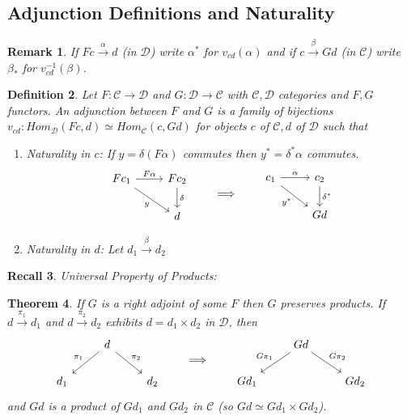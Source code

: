 \documentclass[a4paper,12pt]{article}
\newtheorem{thm}{Theorem}[section]
\newtheorem{defn}[thm]{Definition}
\newtheorem{rmk}[thm]{Remark}
\newtheorem{rec}[thm]{Recall}
\begin{document}
\subsection{Adjunction Definitions and Naturality}
\begin{rmk}
    If $Fc\xrightarrow{\alpha} d$ (in $\mathcal{D}$) write $\alpha^*$ for $v_{cd}(\alpha)$ and if $c\xrightarrow{\beta}Gd$ (in $\mathcal{C}$) write $\beta_*$ for $v_{cd}^{-1}(\beta)$. 
\end{rmk}
\begin{defn}
    Let $F:\mathcal{C}\to\mathcal{D}$ and $G:\mathcal{D}\to \mathcal{C}$ with $\mathcal{C,D}$ categories and $F,G$ functors. An adjunction between $F$ and $G$ is a family of bijections $v_{cd}:Hom_{\mathcal{D}}(Fc,d)\simeq Hom_{\mathcal{C}}(c,Gd)$ for objects $c$ of $\mathcal{C}, d$ of $\mathcal{D}$ such that 
    \begin{enumerate}
        \item Naturality in $c$: If $y=\delta(F\alpha)$ commutes then $y^*=\delta^*\alpha$ commutes. 
        \[
        \begin{tikzcd}
            Fc_1 \arrow[r, "F\alpha"] \arrow[dr, "y"'] & Fc_2 \arrow[d, "\delta"] \\
            & d
        \end{tikzcd}
        \qquad\Longrightarrow\qquad
        \begin{tikzcd}
            c_1 \arrow[r, "\alpha"] \arrow[dr, "y^*"'] & c_2 \arrow[d, "\delta^*"] \\
            & Gd
        \end{tikzcd}
        \]
        \item Naturality in $d$: Let $d_1\xrightarrow{\beta}d_2$ 
    \end{enumerate}
\end{defn}
\begin{rec}
    Universal Property of Products: 
\end{rec}
\begin{thm}
    If $G$ is a right adjoint of some $F$ then $G$ preserves products. If $d\xrightarrow{\pi_1} d_1$ and $d\xrightarrow{\pi_2} d_2$ exhibits $d=d_1\times d_2$ in $\mathcal{D}$, then
    \[
    \begin{tikzcd}
        & d \arrow[dl, "\pi_1"'] \arrow[dr, "\pi_2"] & \\
        d_1 & & d_2
    \end{tikzcd}
    \qquad\Longrightarrow\qquad
    \begin{tikzcd}
        & Gd \arrow[dl, "G\pi_1"'] \arrow[dr, "G\pi_2"] & \\
        Gd_1 & & Gd_2
    \end{tikzcd}
    \]
    and $Gd$ is a product of $Gd_1$ and $Gd_2$ in $\mathcal{C}$ (so $Gd\simeq Gd_1\times Gd_2$).
\end{thm}
\end{document}
